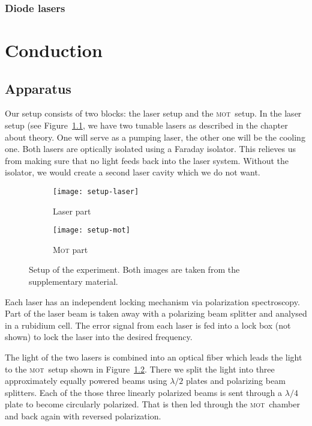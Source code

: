 \documentclass[11pt, english, fleqn, DIV=15, headinclude, BCOR=2cm]{scrreprt}
\newcommand\mot{\textsc{mot}}
\begin{document}
\subsection{Diode lasers}

\chapter{Conduction}

\section{Apparatus}

Our setup consists of two blocks: the laser setup and the \mot\ setup. In the
laser setup (see Figure~\ref{fig:setup-laser}, we have two tunable lasers as
described in the chapter about theory. One will serve as a pumping laser, the
other one will be the cooling one. Both lasers are optically isolated using a
Faraday isolator. This relieves us from making sure that no light feeds back
into the laser system. Without the isolator, we would create a second laser
cavity which we do not want.

\begin{figure}
    \centering
    \begin{subfigure}[c]{0.47\linewidth}
        \centering
        \texttt{[image: setup-laser]}
        \caption{%
            Laser part
        }
        \label{fig:setup-laser}
    \end{subfigure}
    \hfill
    \begin{subfigure}[c]{0.47\linewidth}
        \centering
        \texttt{[image: setup-mot]}
        \caption{%
            \textsc{Mot} part
        }
        \label{fig:setup-mot}
    \end{subfigure}
    \caption{%
        Setup of the experiment. Both images are taken from the supplementary
        material.
    }
    \label{fig:setup}
\end{figure}

Each laser has an independent locking mechanism via polarization spectroscopy.
Part of the laser beam is taken away with a polarizing beam splitter and
analysed in a rubidium cell. The error signal from each laser is fed into a
lock box (not shown) to lock the laser into the desired frequency.

The light of the two lasers is combined into an optical fiber which leads the
light to the \mot\ setup shown in Figure~\ref{fig:setup-mot}. There we split
the light into three approximately equally powered beams using $\lambda/2$
plates and polarizing beam splitters. Each of the those three linearly
polarized beams is sent through a $\lambda/4$ plate to become circularly
polarized. That is then led through the \mot\ chamber and back again with
reversed polarization.
\end{document}
